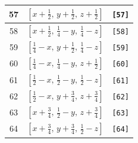 \documentclass[fleqn,8pt]{jsarticle}
\begin{document}
\begin{longtable}{ccc}
57 & $\left[ x + \frac{1}{2},\, y + \frac{1}{2},\, z + \frac{1}{2} \right]$ & {\tt [57]} \\ \hline
58 & $\left[ x + \frac{1}{2},\, \frac{1}{4} - y,\, \frac{1}{4} - z \right]$ & {\tt [58]} \\ \hline
59 & $\left[ \frac{1}{4} - x,\, y + \frac{1}{2},\, \frac{1}{4} - z \right]$ & {\tt [59]} \\ \hline
60 & $\left[ \frac{1}{4} - x,\, \frac{1}{4} - y,\, z + \frac{1}{2} \right]$ & {\tt [60]} \\ \hline
61 & $\left[ \frac{1}{2} - x,\, \frac{1}{2} - y,\, \frac{1}{2} - z \right]$ & {\tt [61]} \\ \hline
62 & $\left[ \frac{1}{2} - x,\, y + \frac{3}{4},\, z + \frac{3}{4} \right]$ & {\tt [62]} \\ \hline
63 & $\left[ x + \frac{3}{4},\, \frac{1}{2} - y,\, z + \frac{3}{4} \right]$ & {\tt [63]} \\ \hline
64 & $\left[ x + \frac{3}{4},\, y + \frac{3}{4},\, \frac{1}{2} - z \right]$ & {\tt [64]} \\
\end{longtable}
\end{document}
